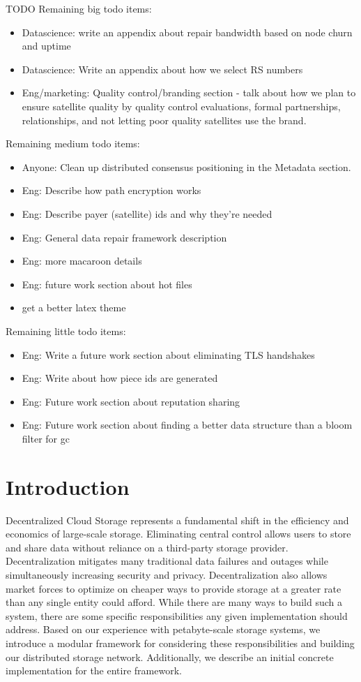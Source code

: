 \documentclass[11pt,fleqn,openany]{book}
\newcommand{\todo}[1]{{\color{red} TODO #1 }}
\begin{document}
\todo{
Remaining big todo items:
\begin{itemize}
\item Datascience: write an appendix about repair bandwidth based on node
  churn and uptime
\item Datascience: Write an appendix about how we select RS numbers
\item Eng/marketing: Quality control/branding section - talk about how we
  plan to ensure satellite quality by quality control evaluations, formal
  partnerships, relationships, and not letting poor quality satellites
  use the brand.
\end{itemize}

Remaining medium todo items:
\begin{itemize}
\item Anyone:
  Clean up distributed consensus positioning in the Metadata section.
\item Eng: Describe how path encryption works
\item Eng: Describe payer (satellite) ids and why they're needed
\item Eng: General data repair framework description
\item Eng: more macaroon details
\item Eng: future work section about hot files
\item get a better latex theme
\end{itemize}

Remaining little todo items:
\begin{itemize}
\item Eng: Write a future work section about eliminating TLS handshakes
\item Eng: Write about how piece ids are generated
\item Eng: Future work section about reputation sharing
\item Eng: Future work section about finding a better data structure than
 a bloom filter for gc
\end{itemize}
}

\chapter{Introduction}

Decentralized Cloud Storage represents a fundamental shift in
the efficiency and economics of large-scale storage.
Eliminating central control allows users to store and share data
without reliance on a third-party storage provider. Decentralization mitigates
many traditional data failures and outages while simultaneously increasing
security and privacy.
Decentralization also allows market forces to optimize on cheaper ways to
provide storage at a greater rate than any single entity could afford.
While there are many ways to build such a system, there are some specific
responsibilities any given implementation should address.
Based on our experience with petabyte-scale
storage systems, we introduce a modular framework for considering these
responsibilities and building our distributed storage network.
Additionally, we describe an initial
concrete implementation for the entire framework.
\end{document}
